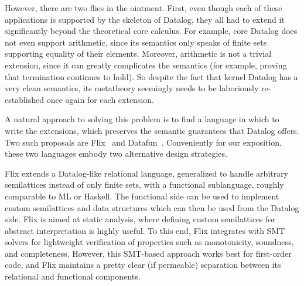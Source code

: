However, there are two flies in the ointment. First, even though each
of these applications is supported by the skeleton of Datalog, they
all had to extend it significantly beyond the theoretical core
calculus.  For example, core Datalog does not even support arithmetic,
since its semantics only speaks of finite sets supporting equality of
their elements. Moreover, arithmetic is not a trivial extension, since
it can greatly complicates the semantics (for example, proving that
termination continues to hold). So despite the fact that kernel
Datalog has a very clean semantics, its metatheory seemingly needs to
be laboriously re-established once again for each extension.

A natural approach to solving this problem is to find a language in which to
write the extensions, which preserves the semantic guarantees that Datalog
offers. Two such proposals are Flix~\cite{flix} and Datafun~\cite{datafun}.
Conveniently for our exposition, these two languages embody two alternative
design strategies.

%
%
%
%
%
%
%

Flix extends a Datalog-like relational language, generalized to handle arbitrary
semilattices instead of only finite sets, with a functional sublanguage, roughly
comparable to ML or Haskell. The functional side can be used to implement custom
semilattices and data structures which can then be used from the Datalog side.
Flix is aimed at static analysis, where defining custom semilattices for
abstract interpretation is highly useful. To this end, Flix integrates with SMT
solvers for lightweight verification of properties such as monotonicity,
soundness, and completeness. However, this SMT-based approach works best for
first-order code, and Flix maintains a pretty clear (if permeable) separation
between its relational and functional components.

